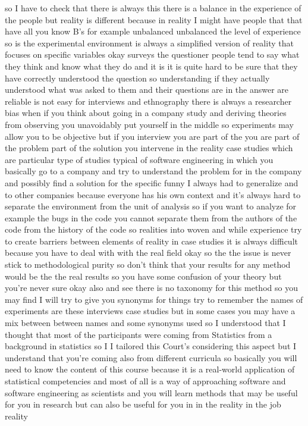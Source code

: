 \documentclass[conference, compsoc, twoside]{IEEEtran}
\begin{document}
so I have to check that there is always this there is a balance in the experience of the people but reality is different because in reality I might have people that that have all you know B's 
for example unbalanced unbalanced the level of experience so is the experimental environment is always a simplified version of reality that focuses on specific variables okay surveys the questioner people tend to say what they think and know what they do and it is it is quite hard to be sure that they have correctly understood the question so understanding if they actually understood what was asked to them and their questions are in the answer are reliable is not easy for interviews and ethnography there is always a researcher bias when if you think about going in a company study and deriving theories from observing you unavoidably put yourself in the middle so experiments may allow you to be objective but if you interview you are part of the you are part of the problem part of the solution you intervene in the reality case studies which are particular type of studies typical of software engineering in which you basically go to a company and try to understand the problem for in the company and possibly find a solution for the specific funny I always had to generalize and to other companies because everyone has his own context and it's always hard to separate the environment from the unit of analysis so if you want to analyze 
for example the bugs in the code you cannot separate them from the authors of the code from the history of the code so realities into woven and while experience try to create barriers between elements of reality in case studies it is always difficult because you have to deal with with the real field okay so the the issue is never stick to methodological purity so don't think that your results for any method would be the the real results so you have some confusion of your theory but you're never sure okay also and see there is no taxonomy for this method so you may find I will try to give you synonyms for things try to remember the names of experiments are these interviews case studies but in some cases you may have a mix between between names and some synonyms used 
so I understood that I thought that most of the participants were coming from Statistics from a background in statistics 
so I I tailored this Court's considering this aspect but I understand that you're coming also from different curricula so basically you will need to know the content of this course because it is a real-world application of statistical competencies and most of all is a way of approaching software and software engineering as scientists and you will learn methods that may be useful for you in research but can also be useful for you in in the reality in the job reality 
\end{document}
